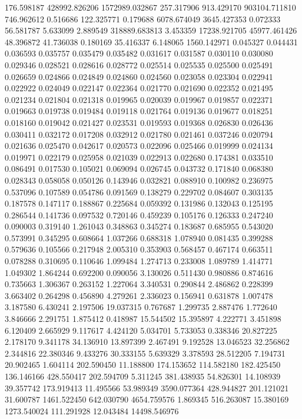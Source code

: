 176.598187
428992.826206
1572989.032867
257.317906
913.429170
903104.711810
746.962612
0.516686
122.325771
0.179688
6078.674049
3645.427353
0.072333
56.581787
5.633099
2.889549
318889.683813
3.453359
17238.921705
45977.461426
48.396872
41.736038
0.180169
35.416337
6.148065
1560.142971
0.045327
0.044431
0.036593
0.035757
0.035479
0.035482
0.031617
0.031587
0.030110
0.030080
0.029346
0.028521
0.028616
0.028772
0.025514
0.025535
0.025500
0.025491
0.026659
0.024866
0.024849
0.024860
0.024560
0.023058
0.023304
0.022941
0.022922
0.024049
0.022147
0.022364
0.021770
0.021690
0.022352
0.021495
0.021234
0.021804
0.021318
0.019965
0.020039
0.019967
0.019857
0.022371
0.019663
0.019738
0.019484
0.019118
0.021764
0.019136
0.019677
0.018251
0.018160
0.019042
0.021427
0.023531
0.019593
0.019368
0.026830
0.026436
0.030411
0.032172
0.017208
0.032912
0.021780
0.021461
0.037246
0.020794
0.021636
0.025470
0.042617
0.020573
0.022096
0.025466
0.019999
0.024134
0.019971
0.022179
0.025958
0.021039
0.022913
0.022680
0.174381
0.033510
0.086491
0.017530
0.105021
0.069094
0.026745
0.043732
0.171840
0.068380
0.028343
0.058058
0.050126
0.143946
0.032821
0.088910
0.100982
0.236975
0.537096
0.107589
0.054786
0.091569
0.138279
0.229702
0.084607
0.303135
0.187578
0.147117
0.188867
0.225684
0.059392
0.131986
0.132043
0.125195
0.286544
0.141736
0.097532
0.720146
0.459239
0.105176
0.126333
0.247240
0.090003
0.319140
1.261043
0.348863
0.345274
0.183687
0.685955
0.543020
0.573991
0.345295
0.608664
1.037266
0.688318
1.078940
0.081435
0.399288
0.579636
0.105566
0.217948
2.005310
0.353903
0.568457
0.467174
0.663511
0.078288
0.310695
0.110646
1.099484
1.274713
0.233008
1.089789
1.414771
1.049302
1.864244
0.692200
0.090056
3.130026
0.511430
0.980886
0.874616
0.735663
1.306367
0.263152
1.227064
3.340531
0.290844
2.486862
0.228399
3.663402
0.264298
0.456890
4.279261
2.336023
0.156941
0.631878
1.007478
3.187580
6.430241
2.197506
19.037315
0.767687
1.299735
2.887476
1.772640
3.846666
2.291751
1.875412
0.418987
15.544502
15.395897
4.222771
3.451898
6.120409
2.665929
9.117617
4.424120
5.034701
5.733053
0.338346
20.827225
2.178170
9.341178
34.136910
13.897399
2.467491
9.192528
13.046523
32.256862
2.344816
22.380346
9.433276
30.333155
5.639329
3.378593
28.512205
7.194731
20.902465
1.604114
202.590450
11.188800
174.153652
114.582180
182.425450
136.146166
428.550417
202.594709
5.311245
381.438935
54.826301
14.108939
39.357742
173.919413
11.495566
53.989349
3590.077364
428.944827
201.121021
31.600787
1461.522450
642.030790
4654.759576
1.869345
516.263087
15.380169
1273.540024
111.291928
12.043484
14498.546976
